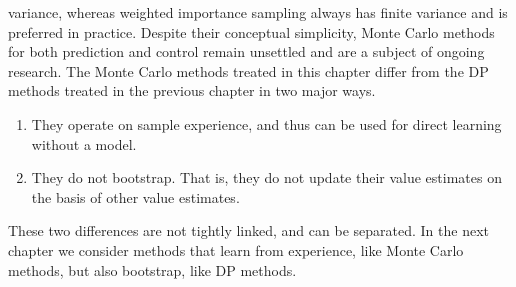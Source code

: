 variance, whereas weighted importance sampling always has finite variance and is preferred in
practice.
Despite their conceptual simplicity, 
Monte Carlo methods for both prediction and control remain unsettled and are a subject
of ongoing research.
The Monte Carlo methods treated in this chapter differ from the DP methods treated
in the previous chapter in two major ways.
\begin{enumerate}
    \item They operate on sample experience, and thus can be used for direct learning
    without a model.
    \item They do not bootstrap.
    That is, they do not update their value estimates on the basis of other value estimates.
\end{enumerate}
These two differences are not tightly linked, and can be separated.
In the next chapter we consider methods that learn from experience, like Monte Carlo methods,
but also bootstrap, like DP methods.
